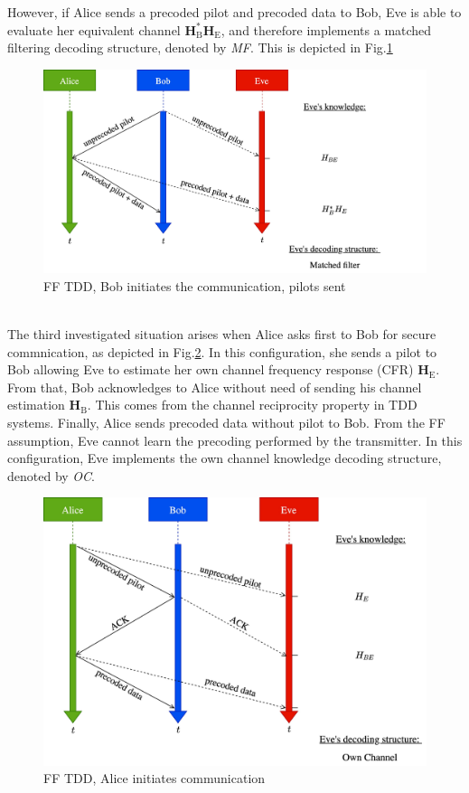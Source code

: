 \documentclass[journal,comsoc]{IEEEtran}
\let\MYoriglatexcaption\caption
\renewcommand{\caption}[2][\relax]{\MYoriglatexcaption[#2]{#2}}
\newcommand{\HE}{\textbf{H}_{\text{E}}}
\newcommand{\HB}{\textbf{H}_{\text{B}}}
\begin{document}
However, if Alice sends a precoded pilot and  precoded data to Bob, Eve is able to evaluate her equivalent channel $\HB^*\HE$, and therefore implements a matched filtering decoding structure, denoted by \textit{MF}. This is depicted in Fig.\ref{fig_ff_tdd_b_pilot}
\begin{figure}[!htb]
	\centering
	\includegraphics[width=.95\linewidth]{graphs/diagram_sequence-FF_TDD_B_pilot.jpg}
	\caption{FF TDD, Bob initiates the communication, pilots sent}
	\label{fig_ff_tdd_b_pilot}
\end{figure}\\
The third investigated situation arises when Alice asks first to Bob for secure commnication, as depicted in Fig.\ref{fig_ff_tdd_a}. In this configuration, she sends a pilot to Bob allowing Eve to estimate her own channel frequency response (CFR) $\HE$. From that, Bob acknowledges to Alice without need of sending his channel estimation $\HB$. This comes from the channel reciprocity property in TDD systems. Finally, Alice sends precoded data without pilot to Bob. From the FF assumption, Eve cannot learn the precoding performed by the transmitter. In this configuration, Eve implements the own channel knowledge decoding structure, denoted by \textit{OC}. 
\begin{figure}[!htb]
	\centering
	\includegraphics[width=.85\linewidth]{graphs/diagram_sequence-FF_TDD_A.jpg}
	\caption{FF TDD, Alice initiates communication}
	\label{fig_ff_tdd_a}
\end{figure}
\end{document}

